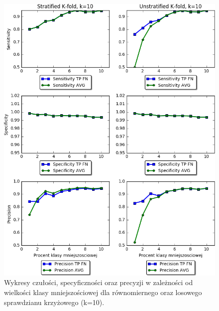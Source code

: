 \begin{figure}[H]
	\centering
	\includegraphics[width=\textwidth]{./images/wsk.png}
	\caption[Wykresy miar dla sprawdzianu krzyżowego]{Wykresy czułości, specyficzności oraz precyzji w zależności od wielkości klasy mniejszościowej dla równomiernego oraz losowego sprawdzianu krzyżowego (k=10).}
	\label{fig:wskazniki}
\end{figure}

